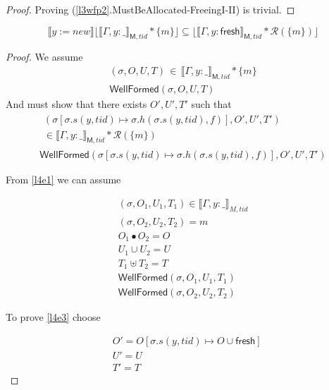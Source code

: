 \begin{proof}
Proving (\ref{l3wfp2}.\textsf{MustBeAllocated-FreeingI-II}) is  trivial.

\end{proof}

\begin{Lemma}
\[
\llbracket y := new \rrbracket \lfloor \llbracket \Gamma,y:\_ \rrbracket_{\textsf{M},tid} * \{m\}\rfloor  \subseteq\lfloor \llbracket \Gamma,y:\mathsf{fresh} \rrbracket_{\textsf{M},tid}  * \mathcal{R}(\{m\})\rfloor 
\]
\end{Lemma}
\begin{proof}
We assume 
\begin{gather} \label{l4e1}
(\sigma,O,U,T) \, \in \, \llbracket \Gamma,y:\_ \rrbracket_{\textsf{M},tid} * \{m\}
\\
\label{l4ewfa}
\textsf{WellFormed}(\sigma,O,U,T) 
\end{gather}
And must show that there exists $O',U',T'$ such that
\begin{gather} 
\begin{split}
\label{l4e3} 
(\sigma[ \sigma.s(y,tid) \mapsto \sigma.h(\sigma.s(y,tid),f) ], O',U',T')  \\
\in \llbracket \Gamma, y:\_ \rrbracket_{\textsf{M},tid} * \mathcal{R}(\{m\})
\end{split}
\\
\label{l4ewfa}
\textsf{WellFormed}(\sigma[ \sigma.s(y,tid) \mapsto \sigma.h(\sigma.s(y,tid),f) ],O',U',T')
\end{gather}

From \ref{l4e1} we can assume 

\begin{gather} \label{l4e4}
(\sigma, O_{1}, U_{1}, T_{1}) \in \llbracket \Gamma, y:\_ \rrbracket_{M,tid}
\\
 \label{l4e5}
(\sigma, O_{2}, U_{2}, T_{2}) = m 
\\
\label{l4e6}
O_{1} \bullet O_{2} = O
\\
 \label{l4e7}
U_{1} \cup U_{2} = U
\\
 \label{l4e8}
T_{1} \uplus T_{2} = T
\\
\label{l4wfa1}
\textsf{WellFormed}(\sigma,O_{1},U_{1},T_{1})
\\
\label{l4wfa2}
\textsf{WellFormed}(\sigma,O_{2},U_{2},T_{2})
\end{gather}

To prove \ref{l4e3} choose

\[
\begin{array}{cl}
&O' = O[\sigma.s(y,tid) \mapsto O  \cup \mathsf{fresh}]\\
&U' = U\\
&T' = T
\end{array}
\]


\end{proof}
